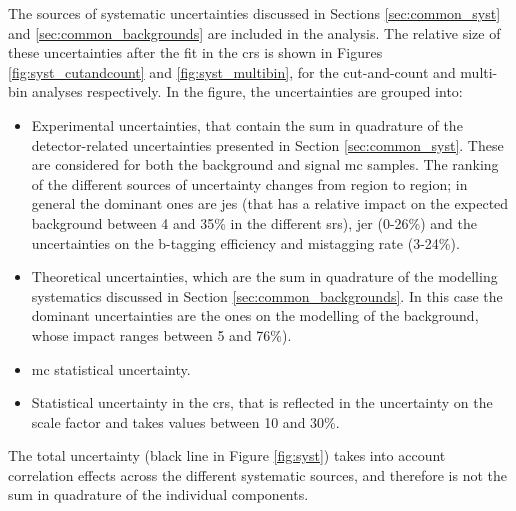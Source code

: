 The sources of systematic uncertainties discussed in Sections \ref{sec:common_syst} and \ref{sec:common_backgrounds} are included in the analysis.
The relative size of these uncertainties after the fit in the \glspl{cr} is shown in Figures \ref{fig:syst_cutandcount} and \ref{fig:syst_multibin},
for the cut-and-count and multi-bin analyses respectively. 
In the figure, the uncertainties are grouped into:
\begin{itemize}
\item Experimental uncertainties, that contain the sum in quadrature of the detector-related uncertainties 
presented in Section \ref{sec:common_syst}. These are considered for both the background and signal \gls{mc} samples.
The ranking of the different sources of uncertainty changes from region to region; in general the dominant ones are \gls{jes} (that has a 
relative impact on the expected background between 4 and 35\% in the different \glspl{sr}), \gls{jer} (0-26\%) and the uncertainties on the 
b-tagging efficiency and mistagging rate (3-24\%).

\item Theoretical uncertainties, which are the sum in quadrature of the modelling systematics discussed in Section \ref{sec:common_backgrounds}.
In this case the dominant uncertainties are the ones on the modelling of the \ttbar background, whose impact ranges between 5 and 76\%).

\item \gls{mc} statistical uncertainty.

\item Statistical uncertainty in the \glspl{cr}, that is reflected in the uncertainty on the \ttbar scale factor and takes values between 10 and 30\%.

\end{itemize}

The total uncertainty (black line in Figure \ref{fig:syst}) takes into account correlation effects across the different systematic sources, 
and therefore is not the sum in quadrature of the individual components. 


